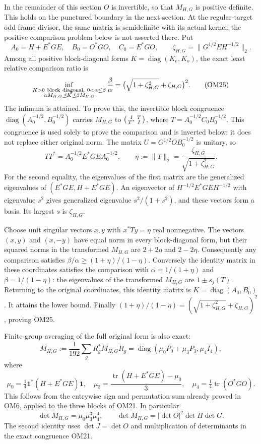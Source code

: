\documentclass[11pt]{article}
\newcommand{\tr}{\operatorname{tr}}
\newcommand{\diag}{\operatorname{diag}}
\newcommand{\one}{\mathbf 1}
\begin{document}
In the remainder of this section $O$ is invertible, so that $M_{H,G}$
is positive definite.  This holds on the punctured boundary in
the next section.  At the regular-target odd-frame divisor, the
same matrix is semidefinite with its actual kernel; the positive
comparison problem below is not asserted there.
Put
\[
A_0=H+E^*GE,\quad B_0=O^*GO,\quad C_0=E^*GO,\qquad
\zeta_{H,G}=\|G^{1/2}EH^{-1/2}\|_2 .
\tag{OM24}
\]
Among all positive block-diagonal forms $K=\diag(K_e,K_o)$,
the exact least relative comparison ratio is
\[
\inf_{\substack{K>0\ {\rm block\ diagonal},\ 0<\alpha\le\beta\\
                 \alpha M_{H,G}\preceq K\preceq\beta M_{H,G}}}
\frac{\beta}{\alpha}
=\bigl(\sqrt{1+\zeta_{H,G}^2}+\zeta_{H,G}\bigr)^2.
\tag{OM25}
\]
The infimum is attained.  To prove this, the invertible block
congruence $\diag(A_0^{-1/2},B_0^{-1/2})$ carries $M_{H,G}$ to
$\begin{psmallmatrix}I&T\\T^*&I\end{psmallmatrix}$, where
$T=A_0^{-1/2}C_0B_0^{-1/2}$.  This congruence is used solely
to prove the comparison and is inverted below; it does not
replace either original norm.  The matrix
$U=G^{1/2}OB_0^{-1/2}$ is unitary, so
\[
TT^*=A_0^{-1/2}E^*GEA_0^{-1/2},\qquad
\eta:=\|T\|_2=\frac{\zeta_{H,G}}{\sqrt{1+\zeta_{H,G}^2}}.
\tag{OM26}
\]
For the second equality, the eigenvalues of the first matrix are
the generalized eigenvalues of $(E^*GE,H+E^*GE)$.
An eigenvector of $H^{-1/2}E^*GEH^{-1/2}$ with eigenvalue
$s^2$ gives generalized eigenvalue $s^2/(1+s^2)$, and these
vectors form a basis.  Its largest $s$ is $\zeta_{H,G}$.

Choose unit singular vectors $x,y$ with $x^*Ty=\eta$ real
nonnegative.  The vectors $(x,y)$ and $(x,-y)$ have equal
norm in every block-diagonal form, but their squared norms in
the transformed $M_{H,G}$ are $2+2\eta$ and $2-2\eta$.
Consequently any comparison satisfies
$\beta/\alpha\ge(1+\eta)/(1-\eta)$.
Conversely the identity matrix in these coordinates satisfies
the comparison with
$\alpha=1/(1+\eta)$ and $\beta=1/(1-\eta)$:
the eigenvalues of the transformed $M_{H,G}$ are $1\pm s_j(T)$.
Returning to the original coordinates, this identity matrix is
$K=\diag(A_0,B_0)$.  It attains the lower bound.
Finally $(1+\eta)/(1-\eta)=
(\sqrt{1+\zeta_{H,G}^2}+\zeta_{H,G})^2$, proving OM25.

Finite-group averaging of the full original form is also exact:
\[
\overline M_{H,G}
 :=\frac1{192}\sum_gR_g^*M_{H,G}R_g
 =\diag(\mu_0P_0+\mu_3P_3,\mu_4I_4),
\tag{OM27}
\]
where
\[
\mu_0=\tfrac14\one^*(H+E^*GE)\one,\quad
\mu_3=\frac{\tr(H+E^*GE)-\mu_0}{3},\quad
\mu_4=\tfrac14\tr(O^*GO).
\tag{OM28}
\]
This follows from the entrywise sign and permutation sum already
proved in OM6, applied to the three blocks of OM21.  In particular
\[
\det\overline M_{H,G}=\mu_0\mu_3^3\mu_4^4,\qquad
\det M_{H,G}=|\det O|^2\det H\det G.
\tag{OM29}
\]
The second identity uses $\det J=\det O$ and multiplication of
determinants in the exact congruence OM21.
\end{document}
